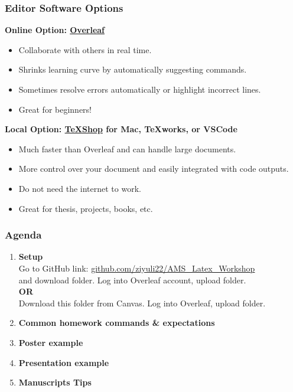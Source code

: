 \documentclass[serif,12pt, aspectratio=169]{beamer}
\begin{document}
\begin{frame}
	\frametitle{Editor Software Options}
	\pause
	\textbf{Online Option: \href{http://www.overleaf.com}{Overleaf}}
	\pause
	\begin{itemize}
		\item Collaborate with others in real time. 
		\pause
		\item Shrinks learning curve by automatically suggesting commands. 
		\pause
		\item Sometimes resolve errors automatically or highlight incorrect lines.
		\pause
		\item Great for beginners!
	\end{itemize}
	\pause
	\textbf{Local Option: \href{https://pages.uoregon.edu/koch/texshop/installingtexshop.html}{TeXShop} for Mac, TeXworks, or VSCode}
	\pause
	\begin{itemize}
		\item Much faster than Overleaf and can handle large documents. 
		\pause
		\item More control over your document and easily integrated with code outputs. 
		\pause
		\item Do not need the internet to work. 
		\pause
		\item Great for thesis, projects, books, etc. 
	\end{itemize}
\end{frame}


\begin{frame}
	\frametitle{Agenda}
	\pause
	\begin{enumerate}
		\item \textbf{Setup} \\
		Go to GitHub link: \url{github.com/ziyuli22/AMS_Latex_Workshop} \\
		and download folder. Log into Overleaf account, upload folder. \\
		\textbf{OR}\\
		Download this folder from Canvas. Log into Overleaf, upload folder. 
		\item \textbf{Common homework commands \& expectations}
		\item \textbf{Poster example}
		\item \textbf{Presentation example}
		\item \textbf{Manuscripts Tips}
	\end{enumerate}
\end{frame}

\end{document}
